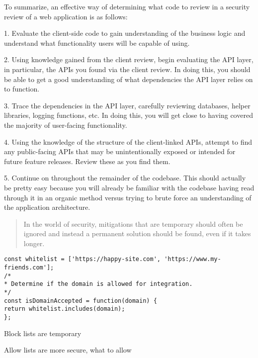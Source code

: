 \documentclass[Screen16to9,17pt]{foils}
\begin{document}
To summarize, an effective way of determining what code to review in a security
review of a web application is as follows:
\begin{list2}
\item[1.] Evaluate the client-side code to gain understanding of the business logic and
understand what functionality users will be capable of using.
\item[2.] Using knowledge gained from the client review, begin evaluating the API layer, in
particular, the APIs you found via the client review. In doing this, you should be
able to get a good understanding of what dependencies the API layer relies on to
function.
\item[3.] Trace the dependencies in the API layer, carefully reviewing databases, helper
libraries, logging functions, etc. In doing this, you will get close to having covered
the majority of user-facing functionality.
\item [4.] Using the knowledge of the structure of the client-linked APIs, attempt to find
any public-facing APIs that may be unintentionally exposed or intended for
future feature releases. Review these as you find them.
\item[5.] Continue on throughout the remainder of the codebase. This should actually be
pretty easy because you will already be familiar with the codebase having read
through it in an organic method versus trying to brute force an understanding of the application architecture.
\end{list2}




\begin{quote}
In the world of security, mitigations that are temporary should often be ignored and
instead a permanent solution should be found, even if it takes longer.
\end{quote}

\begin{verbatim}
const whitelist = ['https://happy-site.com', 'https://www.my-friends.com'];
/*
* Determine if the domain is allowed for integration.
*/
const isDomainAccepted = function(domain) {
return whitelist.includes(domain);
};
\end{verbatim}
\begin{list2}
\item Block lists are temporary
\item Allow lists are more secure, what to allow
\end{list2}
\end{document}
